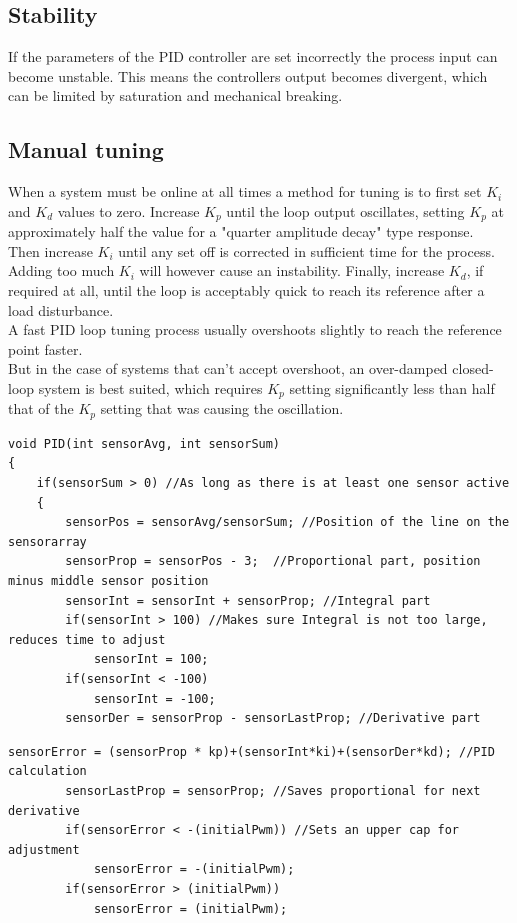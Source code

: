 \subsection {Stability} 

If the parameters of the PID controller are set incorrectly the process input can become unstable.
This means the controllers output becomes divergent, which can be limited by saturation and mechanical breaking. \\

\subsection {Manual tuning} 

When a system must be online at all times a method for tuning is to first set $K_i$ and $K_d$ values to zero. Increase $K_p$ until the loop output oscillates, setting $K_p$ at approximately half the value for a "quarter amplitude decay" type response.\\ 
Then increase $K_i$ until any set off is corrected in sufficient time for the process. Adding too much $K_i$ will however cause an instability. 
Finally, increase $K_d$, if required at all, until the loop is acceptably quick to reach its reference after a load disturbance.
\\ 
A fast PID loop tuning process usually overshoots slightly to reach the reference point faster.\\ 
But in the case of systems that can't accept overshoot, an over-damped closed-loop system is best suited, which requires $K_p$ setting significantly less than half that of the $K_p$ setting that was causing the oscillation.
\\

\begin{lstlisting}
void PID(int sensorAvg, int sensorSum)
{
	if(sensorSum > 0) //As long as there is at least one sensor active
    {
        sensorPos = sensorAvg/sensorSum; //Position of the line on the sensorarray
        sensorProp = sensorPos - 3;  //Proportional part, position minus middle sensor position
        sensorInt = sensorInt + sensorProp; //Integral part
		if(sensorInt > 100) //Makes sure Integral is not too large, reduces time to adjust
            sensorInt = 100;  
        if(sensorInt < -100)
            sensorInt = -100;
        sensorDer = sensorProp - sensorLastProp; //Derivative part
\end{lstlisting}


\begin{lstlisting}
sensorError = (sensorProp * kp)+(sensorInt*ki)+(sensorDer*kd); //PID calculation
        sensorLastProp = sensorProp; //Saves proportional for next derivative
        if(sensorError < -(initialPwm)) //Sets an upper cap for adjustment
            sensorError = -(initialPwm);
        if(sensorError > (initialPwm))
            sensorError = (initialPwm);
\end{lstlisting}


